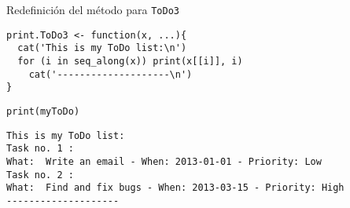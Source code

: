 \documentclass[xcolor={usenames,svgnames,dvipsnames}]{beamer}
\begin{document}
\begin{frame}[fragile,label=sec-2-2-5]{Redefinición del método para \texttt{ToDo3}}
 \lstset{language=R,numbers=none}
\begin{lstlisting}
print.ToDo3 <- function(x, ...){
  cat('This is my ToDo list:\n')
  for (i in seq_along(x)) print(x[[i]], i)
    cat('--------------------\n')
}
\end{lstlisting}

\lstset{language=R,numbers=none}
\begin{lstlisting}
print(myToDo)
\end{lstlisting}

\begin{verbatim}
This is my ToDo list:
Task no. 1 :
What:  Write an email - When: 2013-01-01 - Priority: Low 
Task no. 2 :
What:  Find and fix bugs - When: 2013-03-15 - Priority: High 
--------------------
\end{verbatim}
\end{frame}
\end{document}
